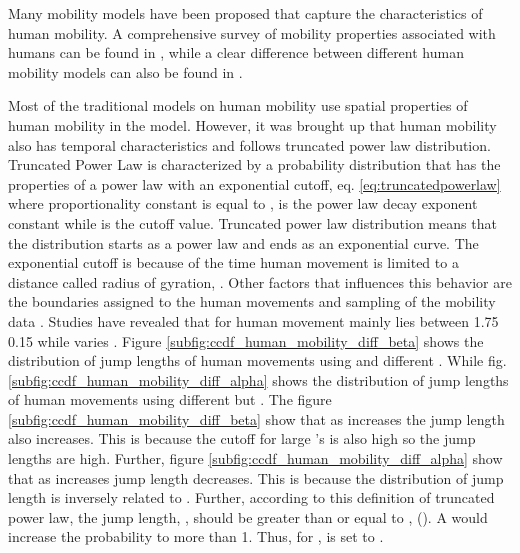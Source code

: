 \documentclass[preprint, twocolumn,5p]{elsarticle}
\begin{document}
    Many mobility models have been proposed that capture the characteristics of human mobility. A comprehensive survey of mobility properties associated with humans can be found in \cite{Karamshuk2011,Roy2011}, while a clear difference between different human mobility models can also be found in \cite{Karamshuk2011}.

    Most of the traditional models on human mobility use spatial properties of human mobility in the model. However, it was brought up that human mobility also has temporal characteristics and follows truncated power law distribution. Truncated Power Law is characterized by a probability distribution that has the properties of a power law with an exponential cutoff, eq. \ref{eq:truncatedpowerlaw} where proportionality constant is equal to ,  is the power law decay exponent constant while  is the cutoff value. Truncated power law distribution means that the distribution starts as a power law and ends as an exponential curve. The exponential cutoff is because  of the time human movement is limited to a distance called radius of gyration,  \cite{Gonzalez2008}. Other factors that influences this behavior are the boundaries assigned to the human movements and sampling of the mobility data \cite{Mossa2002}. Studies have revealed that  for human movement mainly lies between 1.75  0.15 while  varies \cite{Gonzalez2008}. Figure \ref{subfig:ccdf_human_mobility_diff_beta} shows the distribution of jump lengths of human movements using  and different . While fig. \ref{subfig:ccdf_human_mobility_diff_alpha} shows the distribution of jump lengths of human movements using different  but . The figure \ref{subfig:ccdf_human_mobility_diff_beta} show that as  increases the jump length also increases. This is because the cutoff for large 's is also high so the jump lengths are high. Further, figure \ref{subfig:ccdf_human_mobility_diff_alpha} show that as  increases jump length decreases. This is because the distribution of jump length is inversely related to . Further, according to this definition of truncated power law, the jump length, , should be greater than or equal to , (). A  would increase the probability to more than 1. Thus, for ,  is set to .
\end{document}
